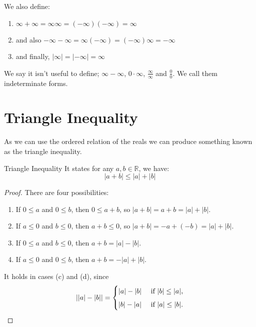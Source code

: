 \documentclass{article}
\newcommand{\R}{\mathbb{R}}
\begin{document}
We also define:
\begin{enumerate}
  \item $\infty + \infty = \infty\infty = (-\infty)(-\infty) = \infty$\\
  \item and also $- \infty - \infty = \infty(-\infty) = (-\infty)\infty = -\infty$\\
  \item and finally, $|\infty| = |-\infty| = \infty$
\end{enumerate}

We say it isn't useful to define; $\infty - \infty$, $0 \cdot \infty$, $\displaystyle{\frac{\infty}{\infty}}$ and $\displaystyle{\frac{0}{0}}$. We call them indeterminate forms.

\section{Triangle Inequality}
As we can use the ordered relation of the reals we can produce something known as the {\color{blue} triangle inequality}.
\begin{theorem}{Triangle Inequality}{}
  It states for any $a, b \in \R$, we have:
  $$ |a + b| \le |a| + |b|$$
\end{theorem}
\begin{proof}
  There are four possibilities:
  \begin{enumerate}
    \item If $0 \le a$ and $0 \le b$, then $0 \le a + b$, so $|a + b| = a + b = |a| + |b|$.
    \item If $a \le 0$ and $b \le 0$, then $a + b \le 0$, so $|a + b| = -a + (-b) = |a| + |b|$.
    \item If $0 \le a$ and $b \le 0$, then $a + b = |a| - |b|$.
    \item If $a \le 0$ and $0 \le b$, then $a + b = -|a| + |b|$.
  \end{enumerate}

It holds in cases (c) and (d), since
$$ ||a| - |b|| = \begin{cases}
|a| - |b| & \text{ if } |b| \le |a|,\vspace{5px}\\
|b| - |a| & \text{ if } |a| \le |b|.\\
\end{cases}
 $$
\end{proof}
\end{document}
